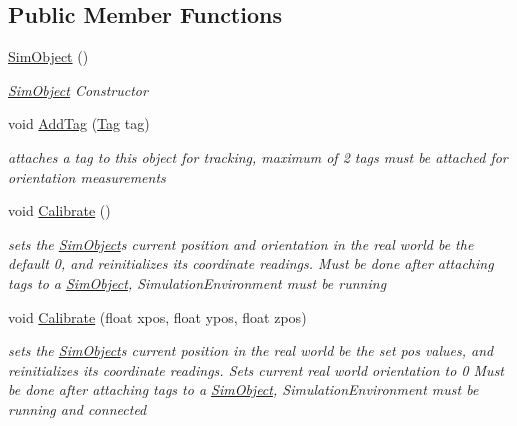 \subsection*{Public Member Functions}
\begin{DoxyCompactItemize}
\item 
\hyperlink{class_pozyx_positioner_1_1_framework_1_1_sim_object_acc186255ccf8c50a2de3aeaf8e65f645}{Sim\+Object} ()
\begin{DoxyCompactList}\small\item\em \hyperlink{class_pozyx_positioner_1_1_framework_1_1_sim_object}{Sim\+Object} Constructor \end{DoxyCompactList}\item 
void \hyperlink{class_pozyx_positioner_1_1_framework_1_1_sim_object_a46185130a7147410af586622732ad64a}{Add\+Tag} (\hyperlink{class_pozyx_positioner_1_1_framework_1_1_tag}{Tag} tag)
\begin{DoxyCompactList}\small\item\em attaches a tag to this object for tracking, maximum of 2 tags must be attached for orientation measurements \end{DoxyCompactList}\item 
void \hyperlink{class_pozyx_positioner_1_1_framework_1_1_sim_object_ae5a40c80792b6e84ae90cf31e2b5fc8f}{Calibrate} ()
\begin{DoxyCompactList}\small\item\em sets the \hyperlink{class_pozyx_positioner_1_1_framework_1_1_sim_object}{Sim\+Object}\textquotesingle{}s current position and orientation in the real world be the default 0, and reinitializes its coordinate readings. Must be done after attaching tags to a \hyperlink{class_pozyx_positioner_1_1_framework_1_1_sim_object}{Sim\+Object}, Simulation\+Environment must be running \end{DoxyCompactList}\item 
void \hyperlink{class_pozyx_positioner_1_1_framework_1_1_sim_object_ad5e3a7c3290c1925d0e7d42a6e8b0111}{Calibrate} (float xpos, float ypos, float zpos)
\begin{DoxyCompactList}\small\item\em sets the \hyperlink{class_pozyx_positioner_1_1_framework_1_1_sim_object}{Sim\+Object}\textquotesingle{}s current position in the real world be the set pos values, and reinitializes its coordinate readings. Sets current real world orientation to 0 Must be done after attaching tags to a \hyperlink{class_pozyx_positioner_1_1_framework_1_1_sim_object}{Sim\+Object}, Simulation\+Environment must be running and connected \end{DoxyCompactList}\item 

\end{DoxyCompactItemize}
